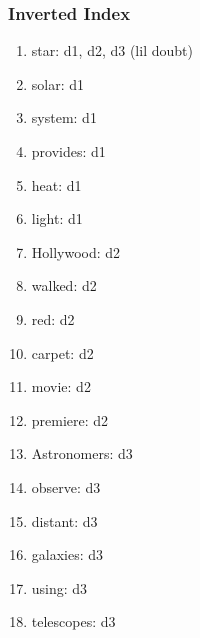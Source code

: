 \subsubsection{Inverted Index}
\begin{enumerate}
    \item star: d1, d2, d3 (lil doubt)
    \item solar: d1
    \item system: d1
    \item provides: d1
    \item heat: d1
    \item light: d1
    \item Hollywood: d2
    \item walked: d2
    \item red: d2
    \item carpet: d2
    \item movie: d2
    \item premiere: d2
    \item Astronomers: d3
    \item observe: d3
    \item distant: d3
    \item galaxies: d3
    \item using: d3
    \item telescopes: d3
\end{enumerate}

